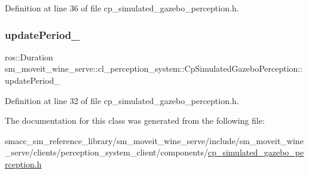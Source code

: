 Definition at line 36 of file cp\+\_\+simulated\+\_\+gazebo\+\_\+perception.\+h.

\mbox{\label{classsm__moveit__wine__serve_1_1cl__perception__system_1_1CpSimulatedGazeboPerception_ab16e770dcf8d2ec2319939382da72227}} 
\subsubsection{\texorpdfstring{update\+Period\+\_\+}{updatePeriod\_}}
{\footnotesize\ttfamily ros\+::\+Duration sm\+\_\+moveit\+\_\+wine\+\_\+serve\+::cl\+\_\+perception\+\_\+system\+::\+Cp\+Simulated\+Gazebo\+Perception\+::update\+Period\+\_\+\hspace{0.3cm}{\ttfamily [private]}}



Definition at line 32 of file cp\+\_\+simulated\+\_\+gazebo\+\_\+perception.\+h.



The documentation for this class was generated from the following file\+:\begin{DoxyCompactItemize}
\item 
smacc\+\_\+sm\+\_\+reference\+\_\+library/sm\+\_\+moveit\+\_\+wine\+\_\+serve/include/sm\+\_\+moveit\+\_\+wine\+\_\+serve/clients/perception\+\_\+system\+\_\+client/components/\hyperlink{sm__moveit__wine__serve_2include_2sm__moveit__wine__serve_2clients_2perception__system__client_23965b489a229ed486b9e3b302468f3db}{cp\+\_\+simulated\+\_\+gazebo\+\_\+perception.\+h}\end{DoxyCompactItemize}
